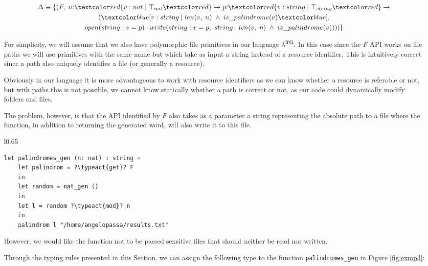 \begin{equation}
    \begin{gathered}
        \Delta \equiv \{(F, \;n{:}\overa{v: nat \;|\; \top_{nat}} \rightarrow p{:}\overa{v: string \;|\; \top_{string}} \rightarrow \\
        (\under{v: string \;|\; len(v, \;n) \;\land\; is\_palindrome(v)}, \\
        open(string: v = p) \cdot write(string: v = p, \;string: len(v, \;n) \;\land\; is\_palindrome(v))))\}
    \end{gathered}
\end{equation}

For simplicity, we will assume that we also have polymorphic file primitives in our language $\lambda^{\textbf{TG}}$. In this case since the $F$ API works on file paths we will use primitives with the same name but which take as input a string instead of a resource identifier. This is intuitively correct since a path also uniquely identifies a file (or generally a resource).

Obviously in our language it is more advantageous to work with resource identifiers as we can know whether a resource is referable or not, but with paths this is not possible, we cannot know statically whether a path is correct or not, as our code could dynamically modify folders and files.

The problem, however, is that the API identified by $F$ also takes as a parameter a string representing the absolute path to a file where the function, in addition to returning the generated word, will also write it to this file.

\begin{wrapfigure}{l}{0.65\textwidth}
    \begin{lstlisting}
let palindromes_gen (n: nat) : string =
    let palindrom = ?\typeact{get}? F
    in
    let random = nat_gen ()
    in
    let l = random ?\typeact{mod}? n
    in
    palindrom l "/home/angelopassa/results.txt"
    \end{lstlisting}
    \caption{Generator of \emph{all} palindromic words of length less than $n$.}
    \label{fig:exmp3}
\end{wrapfigure}

However, we would like the function not to be passed sensitive files that should neither be read nor written.

Through the typing rules presented in this Section, we can assign the following type to the function \verb|palindromes_gen| in Figure \ref{fig:exmp3}:


